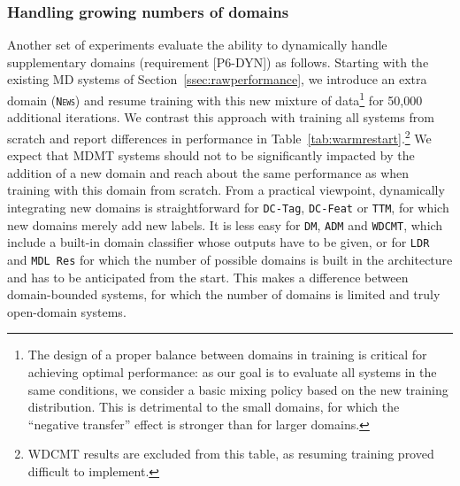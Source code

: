 \documentclass[11pt,a4paper]{article}
\newcommand{\fyDone}[1]{\done[FY]\Todo[FY:]{\textcolor{orange}{#1}}}
\newcommand{\domain}[1]{\texttt{\textsc{#1}}}
\newcommand{\system}[1]{\texttt{{#1}}}
\begin{document}
\subsubsection{Handling growing numbers of domains}
Another set of experiments evaluate the ability to dynamically handle supplementary domains (requirement [P6-DYN]) as follows. Starting with the existing MD systems of Section~\ref{ssec:rawperformance}, we introduce an extra domain (\domain{News}) and resume training with this new mixture of data\footnote{The design of a proper balance between domains in training is critical for achieving optimal performance: as our goal is to evaluate all systems in the same conditions, we consider a basic mixing policy based on the new training distribution. This is detrimental to the small domains, for which the ``negative transfer'' effect is stronger than for larger domains.} for 50,000 additional iterations.\fyDone{Training regime of continuation} We contrast this approach with training all systems from scratch and report differences in performance in Table~\ref{tab:warmrestart}.\footnote{WDCMT results are excluded from this table, as resuming training proved difficult to implement.}\fyDone{Ecrire un commentaire} 
We expect that MDMT systems should not to be significantly impacted by the addition of a new domain and reach about the same performance as when training with this domain from scratch. From a practical viewpoint, dynamically integrating new domains is straightforward for \system{DC-Tag}, \system{DC-Feat} or \system{TTM}, for which new domains merely add new labels. It is less easy for \system{DM}, \system{ADM} and \system{WDCMT}, which include a built-in domain classifier whose outputs have to be given, or for \system{LDR} and \system{MDL~Res} for which the number of possible domains is built in the architecture and has to be anticipated from the start. This makes a difference between domain-bounded systems, for which the number of domains is limited and truly open-domain systems.%
\end{document}
